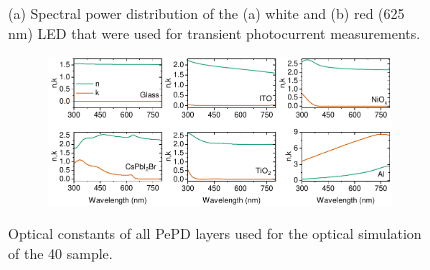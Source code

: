 \begin{figure}[ht!]
    \caption{(a) Spectral power distribution of the (a) white and (b) red (625 nm) LED that were used for transient photocurrent measurements.}
    \label{fig:etl_opt:tpc_sources}
\end{figure}



\begin{figure}[htbp]
    \centering
    \begin{subfigure}[t]{0.99\textwidth}
        \centering
        \includegraphics[width=\textwidth]{chapters/transport_layers/images/nk_transfer_matrix.pdf} %
                
    \end{subfigure}
    \caption{Optical constants of all PePD layers used for the optical simulation of the 40 sample.}
    \label{fig:tetl_opt:nk_transfer_materix}
\end{figure}

